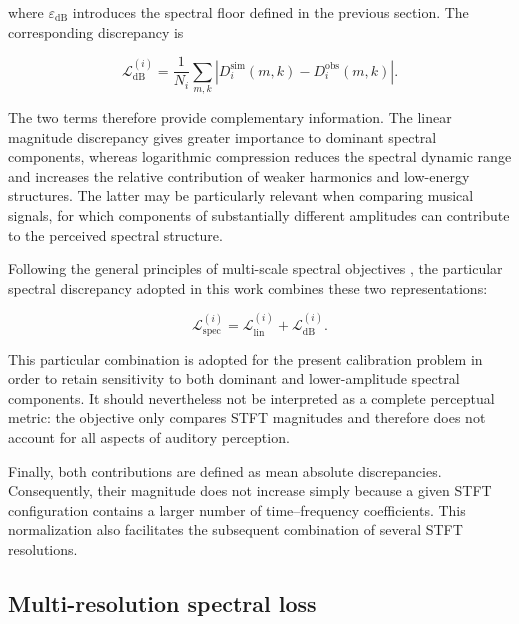 \documentclass[11pt,a4paper]{report}
\theoremstyle{plain}
\theoremstyle{definition}
\begin{document}
where \(\varepsilon_{\mathrm{dB}}\) introduces the spectral floor defined in
the previous section. The corresponding discrepancy is

\begin{equation}
\mathcal{L}_{\mathrm{dB}}^{(i)}
=
\frac{1}{N_i}
\sum_{m,k}
\left|
D_i^{\mathrm{sim}}(m,k)
-
D_i^{\mathrm{obs}}(m,k)
\right|.
\label{eq:db_magnitude_loss}
\end{equation}

The two terms therefore provide complementary information. The linear
magnitude discrepancy gives greater importance to dominant spectral
components, whereas logarithmic compression reduces the spectral dynamic range
and increases the relative contribution of weaker harmonics and low-energy
structures. The latter may be particularly relevant when comparing musical
signals, for which components of substantially different amplitudes can
contribute to the perceived spectral structure.

Following the general principles of multi-scale spectral objectives
\cite{schwaer2023multi}, the particular spectral discrepancy adopted in
this work combines these two representations:

\begin{equation}
\boxed{
\mathcal{L}_{\mathrm{spec}}^{(i)}
=
\mathcal{L}_{\mathrm{lin}}^{(i)}
+
\mathcal{L}_{\mathrm{dB}}^{(i)}.
}
\label{eq:single_resolution_spectral_loss}
\end{equation}

This particular combination is adopted for the present calibration problem in
order to retain sensitivity to both dominant and lower-amplitude spectral
components. It should nevertheless not be interpreted as a complete
perceptual metric: the objective only compares STFT magnitudes and therefore
does not account for all aspects of auditory perception.

Finally, both contributions are defined as mean absolute discrepancies.
Consequently, their magnitude does not increase simply because a given STFT
configuration contains a larger number of time--frequency coefficients. This
normalization also facilitates the subsequent combination of several STFT
resolutions.


\subsection{Multi-resolution spectral loss}
\end{document}
